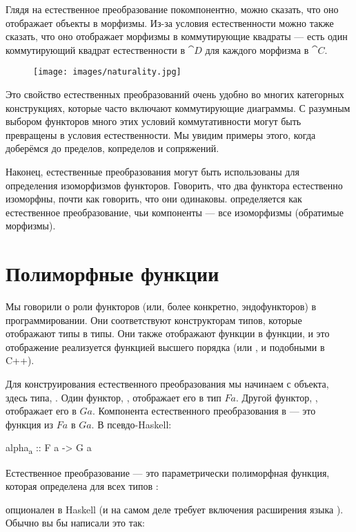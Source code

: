 Глядя на естественное преобразование покомпонентно, можно сказать, что оно
отображает объекты в морфизмы. Из-за условия естественности можно
также сказать, что оно отображает морфизмы в коммутирующие квадраты --- есть один
коммутирующий квадрат естественности в $\cat{D}$ для каждого морфизма в $\cat{C}$.

\begin{figure}[H]
  \centering
  \texttt{[image: images/naturality.jpg]}
\end{figure}

\noindent
Это свойство естественных преобразований очень удобно во многих
категорных конструкциях, которые часто включают коммутирующие диаграммы. С
разумным выбором функторов много этих условий коммутативности
могут быть превращены в условия естественности. Мы увидим примеры
этого, когда доберёмся до пределов, копределов и сопряжений.

Наконец, естественные преобразования могут быть использованы для определения изоморфизмов
функторов. Говорить, что два функтора естественно изоморфны, почти
как говорить, что они одинаковы.  определяется как
естественное преобразование, чьи компоненты --- все изоморфизмы
(обратимые морфизмы).

\section{Полиморфные функции}

Мы говорили о роли функторов (или, более конкретно,
эндофункторов) в программировании. Они соответствуют конструкторам типов, которые
отображают типы в типы. Они также отображают функции в функции, и это
отображение реализуется функцией высшего порядка  (или
,  и подобными в C++).

Для конструирования естественного преобразования мы начинаем с объекта, здесь
типа, . Один функтор, , отображает его в тип
$F a$. Другой функтор, , отображает его в $G a$.
Компонента естественного преобразования  в 
--- это функция из $F a$ в $G a$. В псевдо-Haskell:

\begin{snipv}
alpha\textsubscript{a} :: F a -> G a
\end{snipv}
Естественное преобразование --- это параметрически полиморфная функция, которая определена для
всех типов :

 опционален в Haskell (и на самом деле требует
включения расширения языка ). Обычно
вы бы написали это так:

